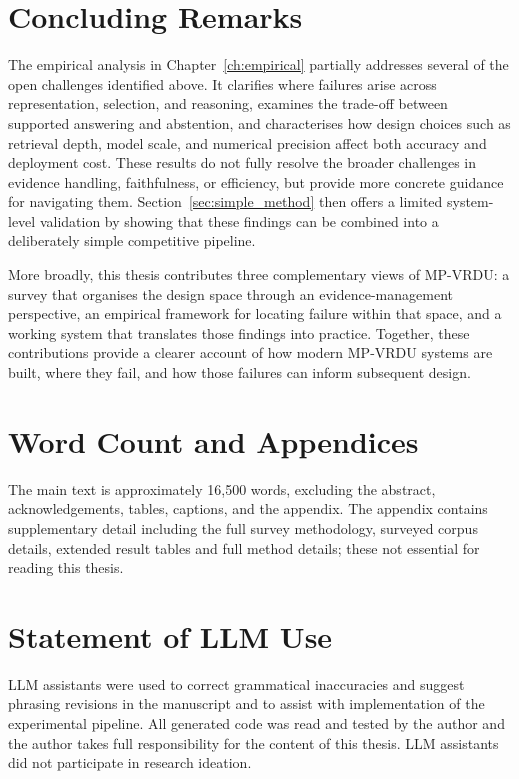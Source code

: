 \documentclass[11pt,twoside,openany]{report}
\begin{document}
\section{Concluding Remarks}
\label{sec:concluding_remarks}

The empirical analysis in Chapter~\ref{ch:empirical} partially addresses several of the open challenges identified above. It clarifies where failures arise across representation, selection, and reasoning, examines the trade-off between supported answering and abstention, and characterises how design choices such as retrieval depth, model scale, and numerical precision affect both accuracy and deployment cost. These results do not fully resolve the broader challenges in evidence handling, faithfulness, or efficiency, but provide more concrete guidance for navigating them. Section~\ref{sec:simple_method} then offers a limited system-level validation by showing that these findings can be combined into a deliberately simple competitive pipeline.

More broadly, this thesis contributes three complementary views of MP-VRDU: a survey that organises the design space through an evidence-management perspective, an empirical framework for locating failure within that space, and a working system that translates those findings into practice. Together, these contributions provide a clearer account of how modern MP-VRDU systems are built, where they fail, and how those failures can inform subsequent design.

\section*{Word Count and Appendices}
The main text is approximately 16{,}500 words, excluding the abstract, acknowledgements, tables, captions, and the appendix. The appendix contains supplementary detail including the full survey methodology, surveyed corpus details, extended result tables and full method details; these not essential for reading this thesis.

\section*{Statement of LLM Use}
LLM assistants were used to correct grammatical inaccuracies and suggest phrasing revisions in the manuscript and to assist with implementation of the experimental pipeline. All generated code was read and tested by the author and the author takes full responsibility for the content of this thesis. LLM assistants did not participate in research ideation.
\end{document}
